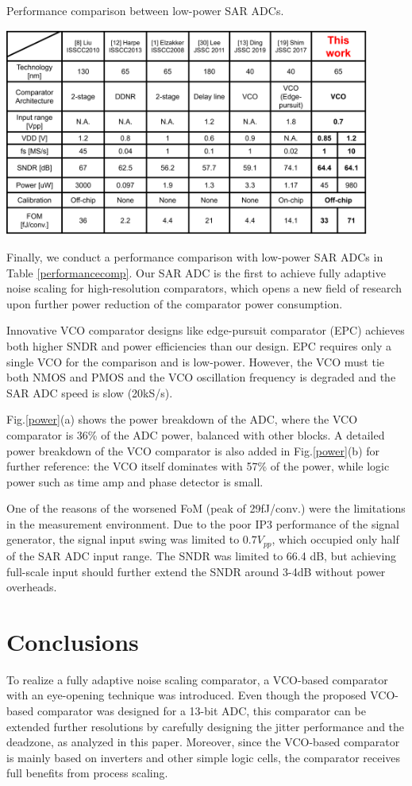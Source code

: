 \documentclass[journal]{IEEEtran}
\begin{document}
\begin{table}[!]
\centering
 \caption{Performance comparison between low-power SAR ADCs.}
 \includegraphics[width=0.9\textwidth]{figs/table.png}
  \label{performancecomp}
\end{table}

Finally, we conduct a performance comparison with low-power SAR ADCs in Table \ref{performancecomp}. Our SAR ADC is the first to achieve fully adaptive noise scaling for high-resolution comparators, which opens a new field of research upon further power reduction of the comparator power consumption. 

Innovative VCO comparator designs like edge-pursuit comparator (EPC) \cite{shim2017edge} achieves both higher SNDR and power efficiencies than our design. EPC requires only a single VCO for the comparison and is low-power. However, the VCO must tie both NMOS and PMOS and the VCO oscillation frequency is degraded and the SAR ADC speed is slow (20kS/s).

Fig.\ref{power}(a) shows the power breakdown of the ADC, where the VCO comparator is 36\% of the ADC power, balanced with other blocks. A detailed power breakdown of the VCO comparator is also added in Fig.\ref{power}(b) for further reference: the VCO itself dominates with 57\% of the power, while logic power such as time amp and phase detector is small.

One of the reasons of the worsened FoM (peak of 29fJ/conv.) were the limitations in the measurement environment. Due to the poor IP3 performance of the signal generator, the signal input swing was limited to $0.7V_{pp}$, which occupied only half of the SAR ADC input range. The SNDR was limited to 66.4 dB, but achieving full-scale input should further extend the SNDR around 3-4dB without power overheads. 

\section{Conclusions}
To realize a fully adaptive noise scaling comparator, a VCO-based comparator with an eye-opening technique was introduced.  Even though the proposed VCO-based comparator was designed for a 13-bit ADC, this comparator can be extended further resolutions by carefully designing the jitter performance and the deadzone, as analyzed in this paper. Moreover, since the VCO-based comparator is mainly based on inverters and other simple logic cells, the comparator receives full benefits from process scaling. %
\end{document}
